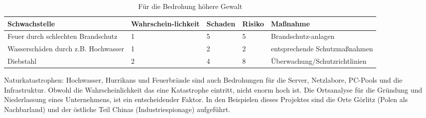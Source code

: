 \begin{table}[H]
\caption{Für die Bedrohung höhere Gewalt}
\begin{tabu} to \linewidth {X[-1,l,m] X[-1,l,m] X[-1,l,m] X[-1,l,m] X[-1,l,m] }
\toprule 
\textbf{Schwachstelle} & \textbf{Wahrschein-\linebreak{}lichkeit} & \textbf{Schaden} & \textbf{Risiko} & \textbf{Maßnahme}\tabularnewline
\midrule 
Feuer durch schlechten Brandschutz & 1 & 5 & 5 & Brandschutz-\linebreak{}anlagen\tabularnewline
Wasserschäden durch z.B. Hochwasser & 1 & 2 & 2 & entsprechende Schutzmaßnahmen\tabularnewline
Diebstahl & 2 & 4 & 8 & Überwachung/Schutzrichtlinien\tabularnewline
\bottomrule
\end{tabu}
\end{table}

Naturkatastrophen: Hochwasser, Hurrikans und Feuerbrände sind auch Bedrohungen für die Server, Netzlabore, PC-Pools und die Infrastruktur. Obwohl die Wahrscheinlichkeit das eine Katastrophe eintritt, nicht enorm hoch ist. Die Ortsanalyse für die Gründung und Niederlassung eines Unternehmens, ist ein entscheidender Faktor. In den Beispielen dieses Projektes sind die Orte Görlitz (Polen als Nachbarland) und der östliche Teil Chinas (Industriespionage) aufgeführt.
